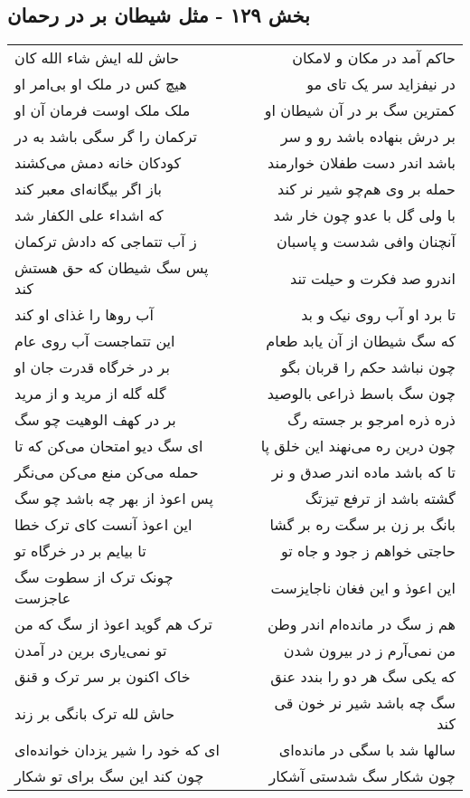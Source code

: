 \begin{center}
\section*{بخش ۱۲۹ - مثل شیطان بر در رحمان}
\label{sec:sh129}
\begin{longtable}{l p{0.5cm} r}
حاش لله ایش شاء الله کان
&&
حاکم آمد در مکان و لامکان
\\
هیچ کس در ملک او بی‌امر او
&&
در نیفزاید سر یک تای مو
\\
ملک ملک اوست فرمان آن او
&&
کمترین سگ بر در آن شیطان او
\\
ترکمان را گر سگی باشد به در
&&
بر درش بنهاده باشد رو و سر
\\
کودکان خانه دمش می‌کشند
&&
باشد اندر دست طفلان خوارمند
\\
باز اگر بیگانه‌ای معبر کند
&&
حمله بر وی هم‌چو شیر نر کند
\\
که اشداء علی الکفار شد
&&
با ولی گل با عدو چون خار شد
\\
ز آب تتماجی که دادش ترکمان
&&
آنچنان وافی شدست و پاسبان
\\
پس سگ شیطان که حق هستش کند
&&
اندرو صد فکرت و حیلت تند
\\
آب روها را غذای او کند
&&
تا برد او آب روی نیک و بد
\\
این تتماجست آب روی عام
&&
که سگ شیطان از آن یابد طعام
\\
بر در خرگاه قدرت جان او
&&
چون نباشد حکم را قربان بگو
\\
گله گله از مرید و از مرید
&&
چون سگ باسط ذراعی بالوصید
\\
بر در کهف الوهیت چو سگ
&&
ذره ذره امرجو بر جسته رگ
\\
ای سگ دیو امتحان می‌کن که تا
&&
چون درین ره می‌نهند این خلق پا
\\
حمله می‌کن منع می‌کن می‌نگر
&&
تا که باشد ماده اندر صدق و نر
\\
پس اعوذ از بهر چه باشد چو سگ
&&
گشته باشد از ترفع تیزتگ
\\
این اعوذ آنست کای ترک خطا
&&
بانگ بر زن بر سگت ره بر گشا
\\
تا بیایم بر در خرگاه تو
&&
حاجتی خواهم ز جود و جاه تو
\\
چونک ترک از سطوت سگ عاجزست
&&
این اعوذ و این فغان ناجایزست
\\
ترک هم گوید اعوذ از سگ که من
&&
هم ز سگ در مانده‌ام اندر وطن
\\
تو نمی‌یاری برین در آمدن
&&
من نمی‌آرم ز در بیرون شدن
\\
خاک اکنون بر سر ترک و قنق
&&
که یکی سگ هر دو را بندد عنق
\\
حاش لله ترک بانگی بر زند
&&
سگ چه باشد شیر نر خون قی کند
\\
ای که خود را شیر یزدان خوانده‌ای
&&
سالها شد با سگی در مانده‌ای
\\
چون کند این سگ برای تو شکار
&&
چون شکار سگ شدستی آشکار
\\
\end{longtable}
\end{center}
